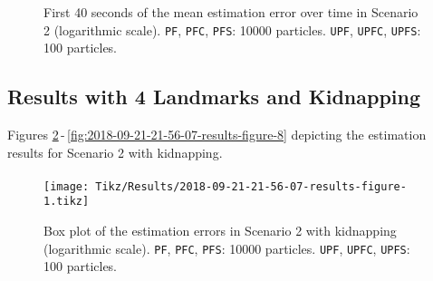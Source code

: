 \begin{figure}
	\centering
	\setlength{} 	
	\setlength\figurewidth{0.9\textheight}		
	\caption[First 40 seconds of the mean estimation error over time in Scenario 2. \texttt{PF}, \texttt{PFC}, \texttt{PFS}: 10000 particles. \texttt{UPF}, \texttt{UPFC}, \texttt{UPFS}: 100 particles.]{First 40 seconds of the mean estimation error over time in Scenario 2 (logarithmic scale). \texttt{PF}, \texttt{PFC}, \texttt{PFS}: 10000 particles. \texttt{UPF}, \texttt{UPFC}, \texttt{UPFS}: 100 particles.}
	\label{fig:2018-09-24-11-26-33-results-figure-7}			
\end{figure}



\subsection{Results with 4 Landmarks and Kidnapping}

Figures \ref{fig:2018-09-21-21-56-07-results-figure-1}\,-\,\ref{fig:2018-09-21-21-56-07-results-figure-8} depicting the estimation results for Scenario 2 with kidnapping.

\paragraph{}



\begin{figure}[h!]
	\centering
	\setlength\figureheight{0.8\textheight} 	
	\setlength{}		
	\texttt{[image: Tikz/Results/2018-09-21-21-56-07-results-figure-1.tikz]}			
	\caption[Box plot of the estimation errors in Scenario 2 with kidnapping. \texttt{PF}, \texttt{PFC}, \texttt{PFS}: 10000 particles. \texttt{UPF}, \texttt{UPFC}, \texttt{UPFS}: 100 particles.]{Box plot of the estimation errors in Scenario 2 with kidnapping (logarithmic scale). \texttt{PF}, \texttt{PFC}, \texttt{PFS}: 10000 particles. \texttt{UPF}, \texttt{UPFC}, \texttt{UPFS}: 100 particles.}	
	\label{fig:2018-09-21-21-56-07-results-figure-1}			
\end{figure}

